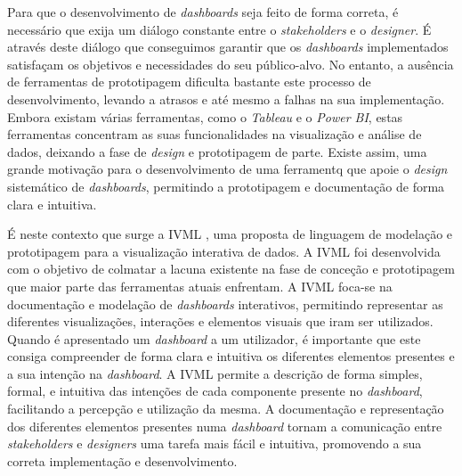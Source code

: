 Para que o desenvolvimento de \textit{dashboards} seja feito de forma correta, é necessário que exija um diálogo constante entre o \textit{stakeholders} e o \textit{designer}. É através deste diálogo que conseguimos garantir que os \textit{dashboards} implementados satisfaçam os objetivos e necessidades do seu público-alvo. No entanto, a ausência de ferramentas de prototipagem dificulta bastante este processo de desenvolvimento, levando a atrasos e até mesmo a falhas na sua implementação. Embora existam várias ferramentas, como o \textit{Tableau} e o \textit{Power BI}, estas ferramentas concentram as suas funcionalidades na visualização e análise de dados, deixando a fase de \textit{design} e prototipagem de parte. Existe assim, uma grande motivação para o desenvolvimento de uma ferramentq que apoie o \textit{design} sistemático de \textit{dashboards}, permitindo a prototipagem e documentação de forma clara e intuitiva.

É neste contexto que surge a \gls{IVML} \cite{Ferreira2023IVML}, uma proposta de linguagem de modelação e prototipagem para a visualização interativa de dados. A \gls{IVML} foi desenvolvida com o objetivo de colmatar a lacuna existente na fase de conceção e prototipagem que maior parte das ferramentas atuais enfrentam. A \gls{IVML} foca-se na documentação e modelação de \textit{dashboards} interativos, permitindo representar as diferentes visualizações, interações e elementos visuais que iram ser utilizados. Quando é apresentado um \textit{dashboard} a um utilizador, é importante que este consiga compreender de forma clara e intuitiva os diferentes elementos presentes e a sua intenção na \textit{dashboard}. A \gls{IVML} permite a descrição de forma simples, formal, e intuitiva das intenções de cada componente presente no \textit{dashboard}, facilitando a percepção e utilização da mesma. A documentação e representação dos diferentes elementos presentes numa \textit{dashboard} tornam a comunicação entre \textit{stakeholders} e \textit{designers} uma tarefa mais fácil e intuitiva, promovendo a sua correta implementação e desenvolvimento.

